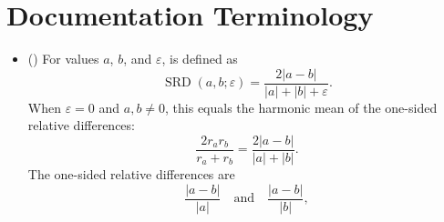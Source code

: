 \documentclass[11pt]{article}
\begin{document}
\label{docstart:terminology_common_utilities}

\section*{Documentation Terminology}
\begin{itemize}
\item (\termSRD) For values \(a\), \(b\), and \(\varepsilon\), \termSRD is defined as
\[
\operatorname{SRD}(a,b;\varepsilon)
=
\frac{2|a-b|}{|a|+|b|+\varepsilon}.
\]
When \(\varepsilon=0\) and \(a,b\neq 0\), this equals the harmonic mean of the one-sided relative differences:
\[
\frac{2r_a r_b}{r_a+r_b}
=
\frac{2|a-b|}{|a|+|b|}.
\]
The one-sided relative differences are
\[
\frac{|a-b|}{|a|}
\quad\text{and}\quad
\frac{|a-b|}{|b|},
\]


\end{itemize}
\end{document}
